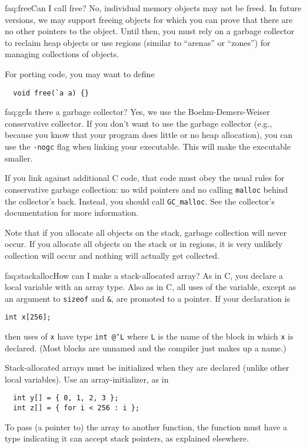 \begin{faqa}{faq:free}{Can I call free?}
No, individual memory objects may not be freed.  In future versions,
we may support freeing objects for which you can prove that there are
no other pointers to the object.  Until then, you must rely on a
garbage collector to reclaim heap objects or use regions (similar to
``arenas'' or ``zones'') for managing collections of objects.

For porting code, you may want to define
\begin{verbatim}
  void free(`a a) {}
\end{verbatim}
\end{faqa}

\begin{faqa}{faq:gc}{Is there a garbage collector?}
Yes, we use the Boehm-Demers-Weiser conservative collector.  If you
don't want to use the garbage collector (e.g., because you know that
your program does little or no heap allocation), you can use the
\texttt{-nogc} flag when linking your executable.  This will make the
executable smaller.

If you link against additional C code, that code must obey the usual
rules for conservative garbage collection: no wild pointers and no
calling \texttt{malloc} behind the collector's back.  Instead, you
should call \texttt{GC_malloc}.  See the collector's documentation for
more information.

Note that if you allocate all objects on the stack, garbage collection
will never occur.  If you allocate all objects on the stack or in
regions, it is very unlikely collection will occur and nothing will
actually get collected.
\end{faqa}

\begin{faqa}{faq:stackalloc}{How can I make a stack-allocated array?}
As in C, you declare a local variable with an array type.  Also as in
C, all uses of the variable, except as an argument to \texttt{sizeof}
and \texttt{\&}, are promoted to a pointer.  If your declaration is
\begin{verbatim}
int x[256];
\end{verbatim}
then uses of \texttt{x} have type \texttt{int @`L\rb} where
\texttt{L} is the name of the block in which \texttt{x} is declared.
(Most blocks are unnamed and the compiler just makes up a name.)

Stack-allocated arrays must be initialized when they are declared
(unlike other local variables).  Use an array-initializer, as in
\begin{verbatim}
  int y[] = { 0, 1, 2, 3 };
  int z[] = { for i < 256 : i };
\end{verbatim}

To pass (a pointer to) the array to another function, the function
must have a type indicating it can accept stack pointers, as explained
elsewhere.
\end{faqa}

